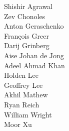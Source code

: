 Shishir Agrawal\\
Zev Chonoles\\
Anton Geraschenko\\
Fran\c{c}ois Greer\\
Darij Grinberg\\
Aise Johan de Jong\\
Adeel Ahmad Khan\\
Holden Lee\\
Geoffrey Lee\\
Akhil Mathew\\
Ryan Reich\\
William Wright\\
Moor Xu\\
